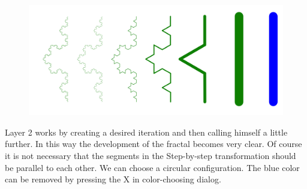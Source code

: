 	    \begin{figure}[H]
	    	\includegraphics[width=0.9\TW]{img/Advanced_Techniques/Step/step_01.png}
	    \end{figure}

	    Layer 2 works by creating a desired iteration and then calling himself a little further.
	    In this way the development of the fractal becomes very clear.
	    Of course it is not necessary that the segments in the Step-by-step transformation should be parallel to each other.
	    We can choose a circular configuration.
	    The blue color can be removed by pressing the X in color-choosing dialog.

